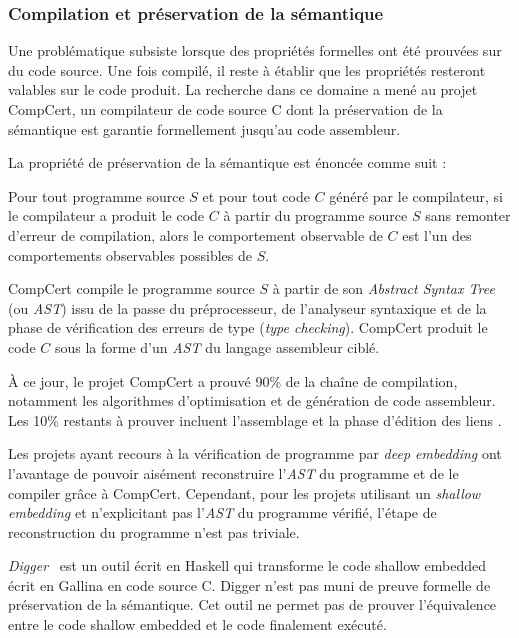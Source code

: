 			\subsubsection{Compilation et préservation de la sémantique}
			\label{compilation}
				Une problématique subsiste lorsque des propriétés formelles ont été prouvées sur du code source. Une fois compilé, il reste à établir que les propriétés resteront valables sur le code produit. La recherche dans ce domaine a mené au projet CompCert\cite{Leroy-backend}, un compilateur de code source C dont la préservation de la sémantique est garantie formellement jusqu'au code assembleur.

	La propriété de préservation de la sémantique est énoncée comme suit :

\begin{theorem}	
	Pour tout programme source $S$ et pour tout code $C$ généré par le compilateur, si le compilateur a produit le code $C$ à partir du programme source $S$ sans remonter d'erreur de compilation, alors le comportement observable de $C$ est l'un des comportements observables possibles de $S$.
\end{theorem}

CompCert compile le programme source $S$ à partir de son \emph{Abstract Syntax Tree} (ou \emph{AST}) issu de la passe du préprocesseur, de l'analyseur syntaxique et de la phase de vérification des erreurs de type (\emph{type checking}). CompCert produit le code $C$ sous la forme d'un \emph{AST} du langage assembleur ciblé.

À ce jour, le projet CompCert a prouvé 90\% de la chaîne de compilation, notamment les algorithmes d'optimisation et de génération de code assembleur. Les 10\% restants à prouver incluent l'assemblage et la phase d'édition des liens \cite{compcert_online}.

Les projets ayant recours à la vérification de programme par \emph{deep embedding} ont l'avantage de pouvoir aisément reconstruire l'\emph{AST} du programme et de le compiler grâce à CompCert. Cependant, pour les projets utilisant un \emph{shallow embedding} et n'explicitant pas l'\emph{AST} du programme vérifié, l'étape de reconstruction du programme n'est pas triviale.

\emph{Digger}~\cite{digger} est un outil écrit en Haskell qui transforme le code shallow embedded écrit en Gallina en code source C. Digger n'est pas muni de preuve formelle de préservation de la sémantique. Cet outil ne permet pas de prouver l'équivalence entre le code shallow embedded et le code finalement exécuté.

